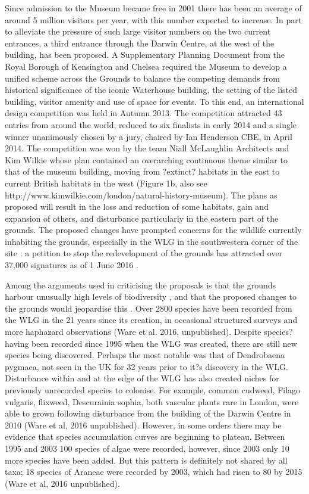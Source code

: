 Since admission to the Museum became free in 2001 there has been an average of around 5 million visitors per year, with this number expected to increase. In part to alleviate the pressure of such large visitor numbers on the two current entrances, a third entrance through the Darwin Centre, at the west of the building, has been proposed. A Supplementary Planning Document from the Royal Borough of Kensington and Chelsea \citep{rbkc:2012} required the Museum to develop a unified scheme across the Grounds to balance the competing demands from historical significance of the iconic Waterhouse building, the setting of the listed building, visitor amenity and use of space for events. To this end, an international design competition was held in Autumn 2013. The competition attracted 43 entries from around the world, reduced to six finalists in early 2014 and a single winner unanimously chosen by a jury, chaired by Ian Henderson CBE, in April 2014. The competition was won by the team Niall McLaughlin Architects and Kim Wilkie whose plan contained an overarching continuous theme similar to that of the museum building, moving from ?extinct? habitats in the east to current British habitats in the west (Figure 1b, also see http://www.kimwilkie.com/london/natural-history-museum). The plans as proposed will result in the loss and reduction of some habitats, gain and expansion of others, and disturbance particularly in the eastern part of the grounds. The proposed changes have prompted concerns for the wildlife currently inhabiting the grounds, especially in the WLG in the southwestern corner of the site \citep{prospect:2015wg, guardian:2015wg, avery:2015wg, telegraph:2015wg, dailymail:2015wg}: a petition to stop the redevelopment of the grounds has attracted over 37,000 signatures as of 1 June 2016 \citep{changepetition:2015wg}.  

Among the arguments used in criticising the proposals is that the grounds harbour unusually high levels of biodiversity \citep{changepetition:2015wg}, and that the proposed changes to the grounds would jeopardise this \citep{avery:2015wg}. Over 2800 species have been recorded from the WLG in the 21 years since its creation, in occasional structured surveys and more haphazard observations (Ware et al. 2016, unpublished). Despite species? having been recorded since 1995 when the WLG was created, there are still new species being discovered.  Perhaps the most notable was that of Dendrobaena pygmaea, not seen in the UK for 32 years prior to it?s discovery in the WLG.  Disturbance within and at the edge of the WLG has also created niches for previously unrecorded species to colonise. For example, common cudweed, Filago vulgaris, flixweed, Descurainia sophia, both vascular plants rare in London, were able to grown following disturbance from the building of the Darwin Centre in 2010 (Ware et al, 2016 unpublished).  However, in some orders there may be evidence that species accumulation curves are beginning to plateau.  Between 1995 and 2003 100 species of algae were recorded, however, since 2003 only 10 more species have been added. But this pattern is definitely not shared by all taxa; 18 species of Araneae were recorded by 2003, which had risen to 80 by 2015 (Ware et al, 2016 unpublished). 

